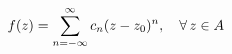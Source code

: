 \documentclass[preview]{standalone}
\begin{document}
\begin{align*}
\special{dvisvgm:raw <g id='unique000'>}f(z) = \sum_{n=-\infty}^{\infty} c_n (z-z_0)^n, \quad \forall\, z \in A\special{dvisvgm:raw </g>}
\end{align*}
\end{document}
